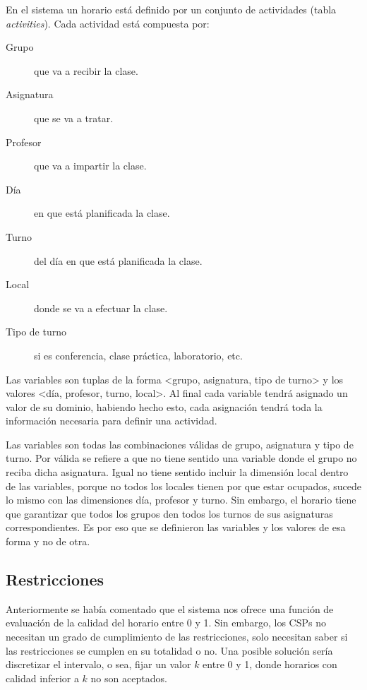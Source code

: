 En el sistema un horario est\'a definido por un conjunto de actividades (tabla \emph{activities}). Cada actividad est\'a compuesta por:

\begin{description}
	\item[Grupo] que va a recibir la clase.
	\item[Asignatura] que se va a tratar.
	\item[Profesor] que va a impartir la clase.
	\item[D\'ia] en que está planificada la clase.
	\item[Turno] del d\'ia en que está planificada la clase.
	\item[Local] donde se va a efectuar la clase.
	\item[Tipo de turno] si es conferencia, clase pr\'actica, laboratorio, etc.
\end{description}

Las variables son tuplas de la forma <grupo, asignatura, tipo de turno> y los valores <día, profesor, turno, local>. Al final cada variable tendr\'a asignado un valor de su dominio, habiendo hecho esto, cada asignaci\'on tendr\'a toda la informaci\'on necesaria para definir una actividad.

Las variables son todas las combinaciones v\'alidas de grupo, asignatura y tipo de turno. Por v\'alida se refiere a que no tiene sentido una variable donde el grupo no reciba dicha asignatura. Igual no tiene sentido incluir la dimensi\'on local dentro de las variables, porque no todos los locales tienen por que estar ocupados, sucede lo mismo con las dimensiones d\'ia, profesor y turno. Sin embargo, el horario tiene que garantizar que todos los grupos den todos los turnos de sus asignaturas correspondientes. Es por eso que se definieron las variables y los valores de esa forma y no de otra. 

\subsection{Restricciones}

Anteriormente se hab\'ia comentado que el sistema nos ofrece una funci\'on de evaluaci\'on de la calidad del horario entre 0 y 1. Sin embargo, los CSPs no necesitan un grado de cumplimiento de las restricciones, solo necesitan saber si las restricciones se cumplen en su totalidad o no. Una posible soluci\'on ser\'ia discretizar el intervalo, o sea, fijar un valor $k$ entre 0 y 1, donde horarios con calidad inferior a $k$ no son aceptados.

